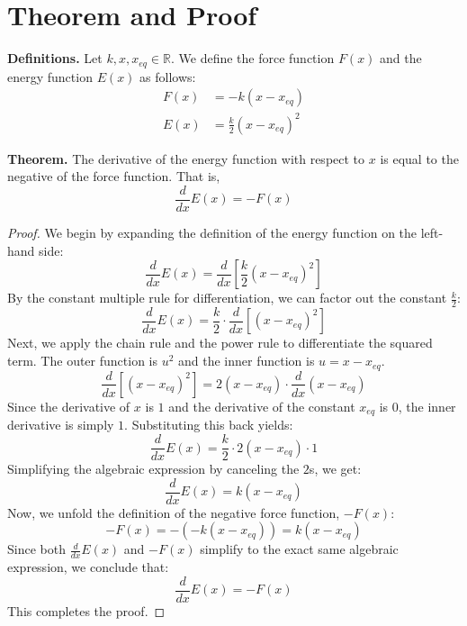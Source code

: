 \documentclass{article}
\begin{document}
\section*{Theorem and Proof}

\textbf{Definitions.} Let $k, x, x_{eq} \in \mathbb{R}$. We define the force function $F(x)$ and the energy function $E(x)$ as follows:
\begin{align*}
    F(x) &= -k(x - x_{eq}) \\
    E(x) &= \frac{k}{2}(x - x_{eq})^2
\end{align*}

\textbf{Theorem.} The derivative of the energy function with respect to $x$ is equal to the negative of the force function. That is,
\[
\frac{d}{dx} E(x) = -F(x)
\]

\begin{proof}
    We begin by expanding the definition of the energy function on the left-hand side:
    \[
    \frac{d}{dx} E(x) = \frac{d}{dx} \left[ \frac{k}{2}(x - x_{eq})^2 \right]
    \]
    By the constant multiple rule for differentiation, we can factor out the constant $\frac{k}{2}$:
    \[
    \frac{d}{dx} E(x) = \frac{k}{2} \cdot \frac{d}{dx} \left[ (x - x_{eq})^2 \right]
    \]
    Next, we apply the chain rule and the power rule to differentiate the squared term. The outer function is $u^2$ and the inner function is $u = x - x_{eq}$. 
    \[
    \frac{d}{dx} \left[ (x - x_{eq})^2 \right] = 2(x - x_{eq}) \cdot \frac{d}{dx}(x - x_{eq})
    \]
    Since the derivative of $x$ is $1$ and the derivative of the constant $x_{eq}$ is $0$, the inner derivative is simply $1$. Substituting this back yields:
    \[
    \frac{d}{dx} E(x) = \frac{k}{2} \cdot 2(x - x_{eq}) \cdot 1
    \]
    Simplifying the algebraic expression by canceling the $2$s, we get:
    \[
    \frac{d}{dx} E(x) = k(x - x_{eq})
    \]
    Now, we unfold the definition of the negative force function, $-F(x)$:
    \[
    -F(x) = -\left( -k(x - x_{eq}) \right) = k(x - x_{eq})
    \]
    Since both $\frac{d}{dx} E(x)$ and $-F(x)$ simplify to the exact same algebraic expression, we conclude that:
    \[
    \frac{d}{dx} E(x) = -F(x)
    \]
    This completes the proof.
\end{proof}
\end{document}
